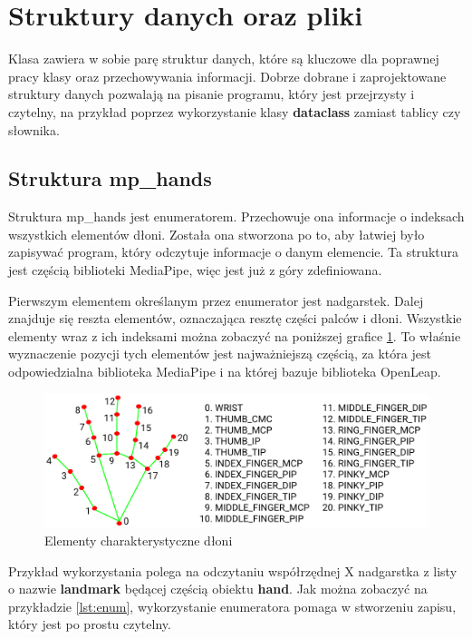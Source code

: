 \section{Struktury danych oraz pliki}

\quad Klasa zawiera w sobie parę struktur danych, które są kluczowe dla poprawnej pracy klasy oraz przechowywania informacji. Dobrze dobrane i zaprojektowane struktury danych pozwalają na pisanie programu, który jest przejrzysty i czytelny, na przykład poprzez wykorzystanie klasy \textbf{dataclass} zamiast tablicy czy słownika. 

\subsection{Struktura mp\_hands}

\quad Struktura mp\_hands jest enumeratorem. Przechowuje ona informacje o indeksach wszystkich elementów dłoni. Została ona stworzona po to, aby łatwiej było zapisywać program, który odczytuje informacje o danym elemencie. Ta struktura jest częścią biblioteki MediaPipe, więc jest już z góry zdefiniowana. 

\quad Pierwszym elementem określanym przez enumerator jest nadgarstek. Dalej znajduje się reszta elementów, oznaczająca resztę części palców i dłoni. Wszystkie elementy wraz z ich indeksami można zobaczyć na poniższej grafice \ref{img:hand_points}. To właśnie wyznaczenie pozycji tych elementów jest najważniejszą częścią, za która jest odpowiedzialna biblioteka MediaPipe i na której bazuje biblioteka OpenLeap. 

\begin{figure}[H]
    \begin{center}
        \includegraphics[width=12.8cm]{../images/hand_landmarks.png}
        \caption{Elementy charakterystyczne dłoni \cite{bib:mediapipe_img}}
        \label{img:hand_points}
    \end{center}
\end{figure}

\quad Przykład wykorzystania polega na odczytaniu współrzędnej X nadgarstka z listy o nazwie \textbf{landmark} będącej częścią obiektu \textbf{hand}. Jak można zobaczyć na przykładzie \ref{lst:enum}, wykorzystanie enumeratora pomaga w stworzeniu zapisu, który jest po prostu czytelny. \newline


